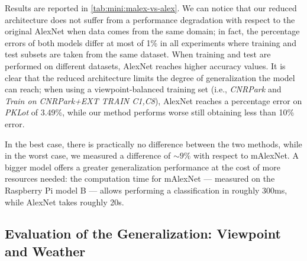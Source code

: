 Results are reported in \ref{tab:mini:malex-vs-alex}.
We can notice that our reduced architecture does not suffer from a performance degradation with respect to the original AlexNet when data comes from the same domain;
in fact, the percentage errors of both models differ at most of 1\% in all experiments where training and test subsets are taken from the same dataset.
When training and test are performed on different datasets, AlexNet reaches higher accuracy values.
It is clear that the reduced architecture limits the degree of generalization the model can reach;
when using a viewpoint-balanced training set (i.e., \emph{CNRPark} and \emph{Train on CNRPark+EXT TRAIN C1,C8}), AlexNet reaches a percentage error on \emph{PKLot} of 3.49\%, while our method performs worse still obtaining less than 10\% error.

In the best case, there is practically no difference between the two methods, while in the worst case, we measured a difference of $\sim 9\%$ with respect to mAlexNet.
A bigger model offers a greater generalization performance at the cost of more resources needed:
the computation time for mAlexNet --- measured on the Raspberry Pi model B --- allows performing a classification in roughly 300ms, while AlexNet takes roughly 20s.

\subsection{Evaluation of the Generalization: Viewpoint and Weather}


